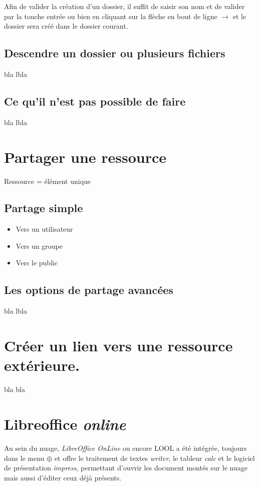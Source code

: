 Afin de valider la création d'un dossier, il suffit de saisir son nom et de valider par la touche entrée ou bien en cliquant sur la flèche en bout de ligne $\rightarrow$ et le dossier sera créé dans le dossier courant.

\subsection{Descendre un dossier ou plusieurs fichiers}

bla lbla

\subsection{Ce qu'il n'est pas possible de faire}

bla lbla

\section{Partager une ressource}

Ressource = élément unique

\subsection{Partage simple}

\begin{itemize}
    \item Vers un utilisateur
    \item Vers un groupe
    \item Vers le public 
\end{itemize}

\subsection{Les options de partage avancées}

bla lbla

\section{Créer un lien vers une ressource extérieure.}

bla bla

\section{Libreoffice \emph{online}}

Au sein du nuage, \emph{LibreOffice OnLine\/} ou encore LOOL a été intégrée, toujours dans le menu $\oplus$ et offre le traitement de textes \emph{writer\/}, le tableur \emph{calc\/} et le logiciel de présentation \emph{impress\/}, permettant d'ouvrir les document montés sur le nuage mais aussi d'éditer ceux déjà présents.
